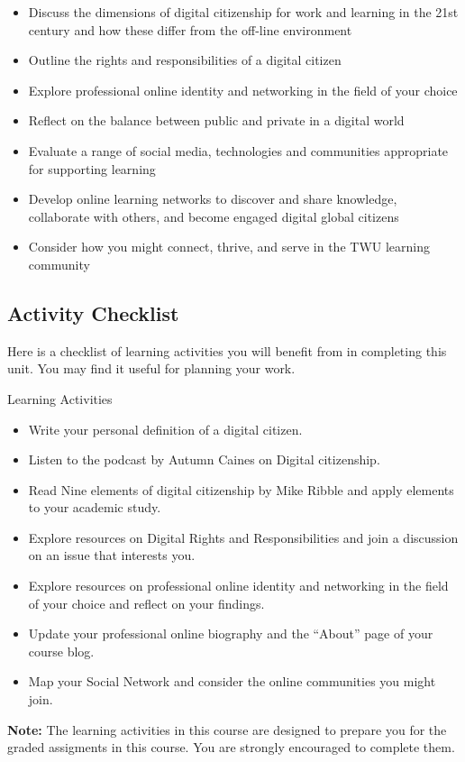 \documentclass[
]{book}
\providecommand{\tightlist}{%
  \setlength{\itemsep}{0pt}\setlength{\parskip}{0pt}}
\theoremstyle{definition}
\theoremstyle{definition}
\theoremstyle{definition}
\theoremstyle{definition}
\theoremstyle{remark}
\begin{document}
\begin{itemize}
\tightlist
\item
  Discuss the dimensions of digital citizenship for work and learning in the 21st century and how these differ from the off-line environment\\
\item
  Outline the rights and responsibilities of a digital citizen\\
\item
  Explore professional online identity and networking in the field of your choice
\item
  Reflect on the balance between public and private in a digital world
\item
  Evaluate a range of social media, technologies and communities appropriate for supporting learning\\
\item
  Develop online learning networks to discover and share knowledge, collaborate with others, and become engaged digital global citizens\\
\item
  Consider how you might connect, thrive, and serve in the TWU learning community
\end{itemize}

\hypertarget{activity-checklist-4}{%
\subsection*{Activity Checklist}\label{activity-checklist-4}}

Here is a checklist of learning activities you will benefit from in completing this unit. You may find it useful for planning your work.

\begin{reflect}
{Learning Activities}

\begin{itemize}
\tightlist
\item
  Write your personal definition of a digital citizen.
\item
  Listen to the podcast by Autumn Caines on Digital citizenship.
\item
  Read Nine elements of digital citizenship by Mike Ribble and apply elements to your academic study.
\item
  Explore resources on Digital Rights and Responsibilities and join a discussion on an issue that interests you.
\item
  Explore resources on professional online identity and networking in the field of your choice and reflect on your findings.
\item
  Update your professional online biography and the ``About'' page of your course blog.
\item
  Map your Social Network and consider the online communities you might join.
\end{itemize}

\textbf{Note:} The learning activities in this course are designed to prepare you for the graded assigments in this course. You are strongly encouraged to complete them.
\end{reflect}
\end{document}
